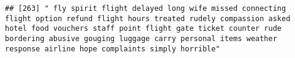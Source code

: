 \documentclass[
]{article}
\begin{document}
\begin{verbatim}
## [263] " fly spirit flight delayed long wife missed connecting flight option refund flight hours treated rudely compassion asked hotel food vouchers staff point flight gate ticket counter rude bordering abusive gouging luggage carry personal items weather response airline hope complaints simply horrible"                                                                                                                                                                                                                                                                                                                                                                                                                                                                                                                                                                                                                                                                                                                                                                                                                                                                                                                                                                                                                                                                                                                                                                                                                                                                                                                                                                                                                                                                                      

\end{verbatim}
\end{document}
